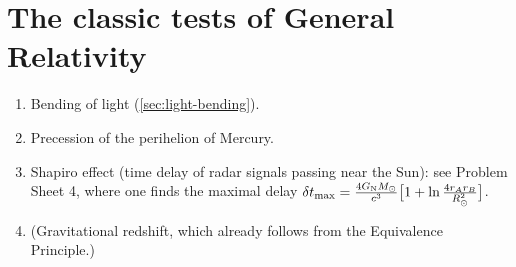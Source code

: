 \section{The classic tests of General Relativity}
\begin{enumerate}[label=(\roman*),nosep]
\item Bending of light (\cref{sec:light-bending}).
\item Precession of the perihelion of Mercury.
\item Shapiro effect (time delay of radar signals passing near the Sun): see Problem Sheet 4, where one finds the maximal delay $\delta t_{\max}=\frac{4G_{\mathrm N} M_\odot}{c^3}\big[1+\ln\frac{4r_Ar_B}{R_\odot^2}\big]$.
\item (Gravitational redshift, which already follows from the Equivalence Principle.)
\end{enumerate}
